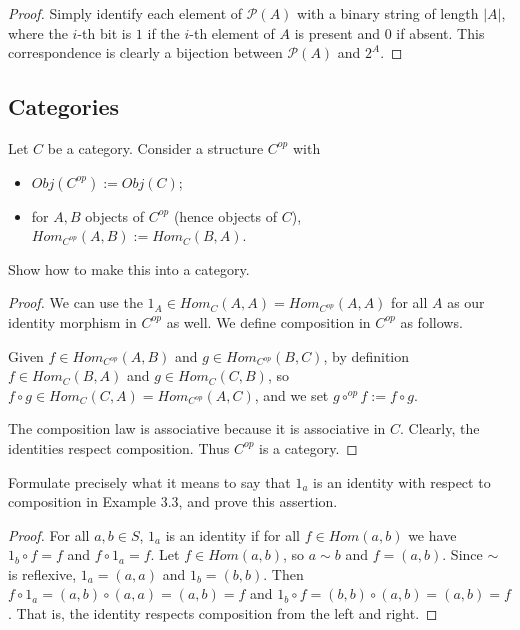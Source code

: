 \begin{proof}
    Simply identify each element of $\mathcal{P}(A)$ with a binary string of length $|A|$,
    where the $i$-th bit is $1$ if the $i$-th element of $A$ is present and $0$ if absent.
    This correspondence is clearly a bijection between $\mathcal{P}(A)$ and $2^A$.
\end{proof}

\subsection{Categories}

\begin{tcolorbox}[title=Problem 1, breakable]  
    Let $C$ be a category. Consider a structure $C^{op}$ with 
    \begin{itemize}
        \item $Obj(C^{op}) := Obj(C)$;
        \item for $A, B$ objects of $C^{op}$ (hence objects of $C$), $Hom_{C^{op}}(A, B) := Hom_C(B, A)$.
    \end{itemize}
    Show how to make this into a category.
\end{tcolorbox}

\begin{proof}
    We can use the $1_A \in Hom_C(A, A) = Hom_{C^{op}}(A, A)$ for all $A$ as our identity morphism in $C^{op}$ as well.
    We define composition in $C^{op}$ as follows. 
    
    Given $f \in Hom_{C^{op}}(A, B)$ and $g \in Hom_{C^{op}}(B, C)$,
        by definition $f \in Hom_C(B, A)$ and $g \in Hom_C(C, B)$, so $f \circ g \in Hom_C(C, A) = Hom_{C^{op}}(A, C)$,
    and we set $g \circ^{op} f := f \circ g$.

    The composition law is associative because it is associative in $C$.
    Clearly, the identities respect composition.
    Thus $C^{op}$ is a category.
\end{proof}

\begin{tcolorbox}[title=Problem 3, breakable] 
    Formulate precisely what it means to say that $1_a$ is an identity with respect to composition in Example 3.3,
        and prove this assertion. 
\end{tcolorbox}

\begin{proof}
    For all $a, b \in S$, $1_a$ is an identity if for all $f \in Hom(a, b)$ we have $1_b \circ f = f$ and $f \circ 1_a = f$.
    Let $f \in Hom(a, b)$, so $a \sim b$ and $f = (a, b)$.
    Since $\sim$ is reflexive, $1_a = (a, a)$ and $1_b = (b,b)$.
    Then $f \circ 1_a = (a,b) \circ (a,a) = (a,b) = f$
        and $1_b \circ f = (b,b) \circ (a,b) = (a,b) = f$.
    That is, the identity respects composition from the left and right.
\end{proof}

